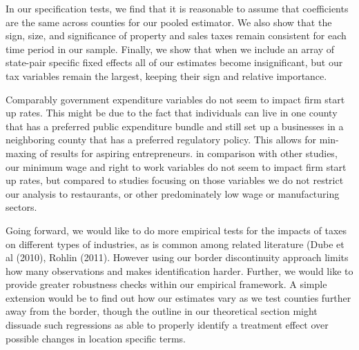 In our specification tests, we find that it is reasonable to assume that coefficients are the same across counties for our pooled estimator. We also show that the sign, size, and significance of property and sales taxes remain consistent for each time period in our sample. Finally, we show that when we include an array of state-pair specific fixed effects all of our estimates become insignificant, but our tax variables remain the largest, keeping their sign and relative importance.

Comparably government expenditure variables do not seem to impact firm start up rates. This might be due to the fact that individuals can live in one county that has a preferred public expenditure bundle and still set up a businesses in a neighboring county that has a preferred regulatory policy. This allows for min-maxing of results for aspiring entrepreneurs. in comparison with other studies, our minimum wage and right to work variables do not seem to impact firm start up rates, but compared to studies focusing on those variables we do not restrict our analysis to restaurants, or other predominately low wage or manufacturing sectors.

Going forward, we would like to do more empirical tests for the impacts of taxes on different types of industries, as is common among related literature (Dube et al (2010), Rohlin (2011). However using our border discontinuity approach limits how many observations and makes identification harder. Further, we would like to provide greater robustness checks within our empirical framework. A simple extension would be to find out how our estimates vary as we test counties further away from the border, though the outline in our theoretical section might dissuade such regressions as able to properly identify a treatment effect over possible changes in location specific terms.